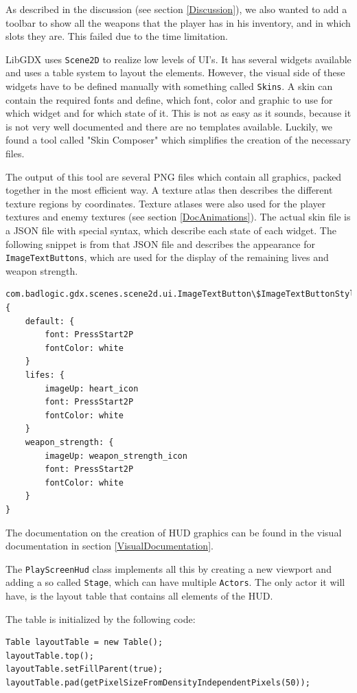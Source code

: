 \documentclass[12p]{article}
\begin{document}
As described in the discussion (see section \ref{Discussion}), we also wanted to add a toolbar to show all the weapons that the player has in his inventory, and in which slots they are. This failed due to the time limitation.

LibGDX uses \texttt{Scene2D} \cite{Scene2DUI} to realize low levels of UI's. It has several widgets available and uses a table system to layout the elements. However, the visual side of these widgets have to be defined manually with something called \texttt{Skins}. A skin can contain the required fonts and define, which font, color and graphic to use for which widget and for which state of it. This is not as easy as it sounds, because it is not very well documented and there are no templates available. Luckily, we found a tool called "Skin Composer" \cite{SkinComposer} which simplifies the creation of the necessary files.

The output of this tool are several PNG files which contain all graphics, packed together in the most efficient way. A texture atlas then describes the different texture regions by coordinates. Texture atlases were also used for the player textures and enemy textures (see section \ref{DocAnimations}). The actual skin file is a JSON file with special syntax, which describe each state of each widget. The following snippet is from that JSON file and describes the appearance for \texttt{ImageTextButtons}, which are used for the display of the remaining lives and weapon strength.

\begin{verbatim}
com.badlogic.gdx.scenes.scene2d.ui.ImageTextButton\$ImageTextButtonStyle: {
	default: {
		font: PressStart2P
		fontColor: white
	}
	lifes: {
		imageUp: heart_icon
		font: PressStart2P
		fontColor: white
	}
	weapon_strength: {
		imageUp: weapon_strength_icon
		font: PressStart2P
		fontColor: white
	}
}
\end{verbatim}

The documentation on the creation of HUD graphics can be found in the visual documentation in section \ref{VisualDocumentation}.

The \texttt{PlayScreenHud} class implements all this by creating a new viewport and adding a so called \texttt{Stage}, which can have multiple \texttt{Actors}. The only actor it will have, is the layout table that contains all elements of the HUD.

The table is initialized by the following code:

\begin{verbatim}
Table layoutTable = new Table();
layoutTable.top();
layoutTable.setFillParent(true);
layoutTable.pad(getPixelSizeFromDensityIndependentPixels(50));
\end{verbatim}
\end{document}
